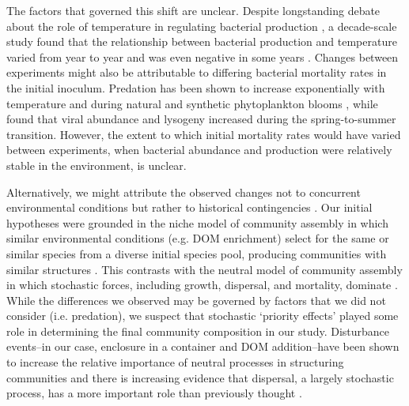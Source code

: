 The factors that governed this shift are unclear. Despite longstanding debate about the role of temperature in regulating bacterial production \citep{pomeroy2001temperature,Kirchman2009-sg}, a decade-scale study found that the relationship between bacterial production and temperature varied from year to year and was even negative in some years \citep{dsvse12}. Changes between experiments might also be attributable to differing bacterial mortality rates in the initial inoculum. Predation has been shown to increase exponentially with temperature and during natural and synthetic phytoplankton blooms \citep{garzio2013microzooplankton,Bird1991-sx,Duarte2005-dm}, while \citet{Brum2016-ig} found that viral abundance and lysogeny increased during the spring-to-summer transition. However, the extent to which initial mortality rates would have varied between experiments, when bacterial abundance and production were relatively stable in the environment, is unclear. 

Alternatively, we might attribute the observed changes not to concurrent environmental conditions but rather to historical contingencies \citep{martiny2006microbial}. Our initial hypotheses were grounded in the niche model of community assembly in which similar environmental conditions (e.g. DOM enrichment) select for the same or similar species from a diverse initial species pool, producing communities with similar structures \citep{fuhrman2006annually}. This contrasts with the neutral model of community assembly in which stochastic forces, including growth, dispersal, and mortality, dominate \citep{hubbell2001unified}. While the differences we observed may be governed by factors that we did not consider (i.e. predation), we suspect that stochastic `priority effects' played some role in determining the final community composition in our study. Disturbance events--in our case, enclosure in a container and DOM addition--have been shown to increase the relative importance of neutral processes in structuring communities and there is increasing evidence that dispersal, a largely stochastic process, has a more important role than previously thought \citep{telford2006dispersal,peay2010evidence,chytry2012dispersal,Fernandez-Gomez2013-wr}. 

